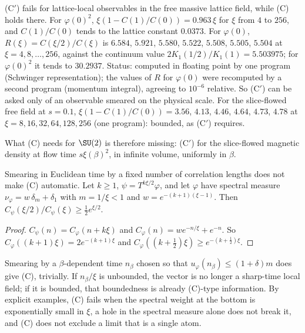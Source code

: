 \begin{observation}\label{neg:obs-Cprime-free}
(C$'$) fails for lattice-local observables in the free massive lattice field, while (C) holds
there. For $\varphi(0)^2$, $\xi(1-C(1)/C(0))=0.963\,\xi$ for $\xi$ from $4$ to $256$, and $C(1)/C(0)$
tends to the lattice constant $0.0373$. For $\varphi(0)$, $R(\xi)=C(\xi/2)/C(\xi)$ is $6.584$,
$5.921$, $5.580$, $5.522$, $5.508$, $5.505$, $5.504$ at $\xi=4,8,\dots,256$, against the continuum
value $2K_1(1/2)/K_1(1)=5.503975$; for $\varphi(0)^2$ it tends to $30.2937$. Status: computed in
floating point by one program (Schwinger representation); the values of $R$ for $\varphi(0)$ were
recomputed by a second program (momentum integral), agreeing to $10^{-6}$ relative. So (C$'$)
can be asked only of an observable smeared on the physical scale. For the slice-flowed free
field at $s=0.1$, $\xi(1-C(1)/C(0))=3.56$, $4.13$, $4.46$, $4.64$, $4.73$, $4.78$ at
$\xi=8,16,32,64,128,256$ (one program): bounded, as (C$'$) requires.
\end{observation}

What (C) needs for $\SU(2)$ is therefore missing: (C$'$) for the slice-flowed magnetic density at
flow time $s\xi(\beta)^2$, in infinite volume, uniformly in $\beta$.

\begin{proposition}\label{neg:prop-smear}
Smearing in Euclidean time by a fixed number of correlation lengths does not make (C)
automatic. Let $k\ge1$, $\psi=T^{k\xi/2}\varphi$, and let $\varphi$ have spectral measure
$\nu_\varphi=w\,\delta_m+\delta_1$ with $m=1/\xi<1$ and $w=e^{-(k+1)(\xi-1)}$. Then
$C_\psi(\xi/2)/C_\psi(\xi)\ge\frac12e^{\xi/2}$.
\end{proposition}

\begin{proof}
$C_\psi(n)=C_\varphi(n+k\xi)$ and $C_\varphi(n)=we^{-n/\xi}+e^{-n}$. So
$C_\varphi((k+1)\xi)=2e^{-(k+1)\xi}$ and $C_\varphi((k+\frac12)\xi)\ge e^{-(k+\frac12)\xi}$.
\end{proof}

Smearing by a $\beta$-dependent time $n_\beta$ chosen so that $u_\varphi(n_\beta)\le(1+\delta)m$
does give (C), trivially. If $n_\beta/\xi$ is unbounded, the vector is no longer a sharp-time
local field; if it is bounded, that boundedness is already (C)-type information. By explicit
examples, (C) fails when the spectral weight at the bottom is exponentially small in $\xi$, a
hole in the spectral measure alone does not break it, and (C) does not exclude a limit that is a
single atom.

